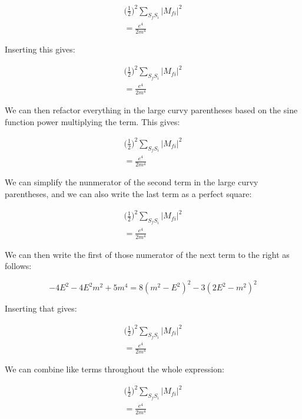\documentclass[a4]{article}
\begin{document}
    \begin{eqnarray}
        \bigg( \frac{1}{2} \bigg)^2 \sum_{S_f S_i} |M_{f i}|^2 \\
        = \frac{e^4}{2 m^4}
    \end{eqnarray}

    Inserting this gives:

    \begin{eqnarray}
        \bigg( \frac{1}{2} \bigg)^2 \sum_{S_f S_i} |M_{f i}|^2 \\
        = \frac{e^4}{2 m^4}
    \end{eqnarray}

    We can then refactor everything in the large curvy parentheses based on the sine function power multiplying the term. This gives:

    \begin{eqnarray}
        \bigg( \frac{1}{2} \bigg)^2 \sum_{S_f S_i} |M_{f i}|^2 \\
        = \frac{e^4}{2 m^4}
    \end{eqnarray}

    We can simplify the nunmerator of the second term in the large curvy parentheses, and we can also write the last term as a perfect square:

    \begin{eqnarray}
        \bigg( \frac{1}{2} \bigg)^2 \sum_{S_f S_i} |M_{f i}|^2 \\
        = \frac{e^4}{2 m^4}
    \end{eqnarray}

    We can then write the first of those numerator of the next term to the right as follows:

    \begin{equation}
        -4 E^2 - 4E^2 m^2 + 5 m^4 = 8 (m^2 - E^2)^2 - 3(2 E^2 - m^2)^2
    \end{equation}

    Inserting that gives:

    \begin{eqnarray}
        \bigg( \frac{1}{2} \bigg)^2 \sum_{S_f S_i} |M_{f i}|^2 \\
        = \frac{e^4}{2 m^4}
    \end{eqnarray}

    We can combine like terms throughout the whole expression:

    \begin{eqnarray}
        \bigg( \frac{1}{2} \bigg)^2 \sum_{S_f S_i} |M_{f i}|^2 \\
        = \frac{e^4}{2 m^4}
    \end{eqnarray}
\end{document}
